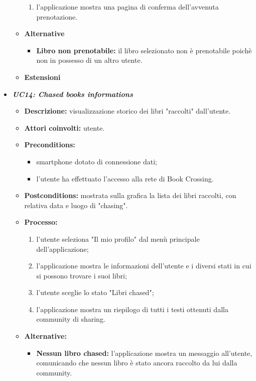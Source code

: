 \begin{itemize}
\begin{itemize}
\begin{enumerate}
			\item l'applicazione mostra una pagina di conferma dell'avvenuta prenotazione.
		\end{enumerate}
		\item \textbf{Alternative}
		\begin{itemize}
			\item \textbf{Libro non prenotabile:} il libro selezionato non è prenotabile poichè non in possesso di un altro utente.
		\end{itemize}
		\item \textbf{Estensioni}
	\end{itemize}
	\item \textbf{\textit{UC14: Chased books informations}}
	\begin{itemize}
		\item \textbf{Descrizione:} visualizzazione storico dei libri "raccolti" dall'utente.
		\item \textbf{Attori coinvolti:} utente.
		\item \textbf{Preconditions:}
		\begin{itemize}
			\item smartphone dotato di connessione dati;
			\item l’utente ha effettuato l’accesso alla rete di Book Crossing.
		\end{itemize}
		\item \textbf{Postconditions:} mostrata sulla grafica la lista dei libri raccolti, con relativa data e luogo di "chasing".
		\item \textbf{Processo:}
		\begin{enumerate}
			\item l'utente seleziona "Il mio profilo" dal menù principale dell'applicazione;
			\item l'applicazione mostra le informazioni dell'utente e i diversi stati in cui si possono trovare i suoi libri;
			\item l'utente sceglie lo stato "Libri chased";
			\item l'applicazione mostra un riepilogo di tutti i testi ottenuti dalla community di sharing.
		\end{enumerate}
		\item \textbf{Alternative:}
		\begin{itemize}
			\item \textbf{Nessun libro chased:} l'applicazione mostra un messaggio all'utente, comunicando che nessun libro è stato ancora raccolto da lui dalla community.
		\end{itemize}

\end{itemize}
\end{itemize}
